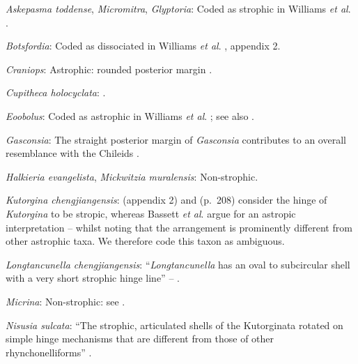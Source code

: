 \documentclass[openany]{book}
\begin{document}
\hypertarget{Askepasma_toddense-coding-71}{}
\emph{Askepasma toddense}, \emph{Micromitra}, \emph{Glyptoria}: Coded as
strophic in Williams \emph{et al}.
\citeyearpar{Williams1998Thediversity}.

\hypertarget{Botsfordia-coding-71}{}
\emph{Botsfordia}: Coded as dissociated in Williams \emph{et al}.
\citeyearpar{Williams1998Thediversity}, appendix 2.

\hypertarget{Craniops-coding-71}{}
\emph{Craniops}: Astrophic: rounded posterior margin \citep[see fig. 91
in][]{Williams2000LinguliformeaCraniiformea}.

\hypertarget{Cupitheca_holocyclata-coding-71}{}
\emph{Cupitheca holocyclata}: \citep{Skovsted2016}.

\hypertarget{Eoobolus-coding-71}{}
\emph{Eoobolus}: Coded as astrophic in Williams \emph{et al}.
\citeyearpar{Williams1998Thediversity}; see also
\citet{Balthasar2009Thebrachiopod}.

\hypertarget{Gasconsia-coding-71}{}
\emph{Gasconsia}: The straight posterior margin of \emph{Gasconsia}
contributes to an overall resemblance with the Chileids
\citep{Holmer2014OrdovicianSilurian}.

\hypertarget{Halkieria_evangelista-coding-71}{}
\emph{Halkieria evangelista}, \emph{Mickwitzia muralensis}:
Non-strophic.

\hypertarget{Kutorgina_chengjiangensis-coding-71}{}
\emph{Kutorgina chengjiangensis}: \citet{Williams1998Thediversity}
(appendix 2) and \citet{Williams2000LinguliformeaCraniiformea} (p.~208)
consider the hinge of \emph{Kutorgina} to be stropic, whereas Bassett
\emph{et al}. \citeyearpar{Bassett2001Functionalmorphology} argue for an
astropic interpretation -- whilst noting that the arrangement is
prominently different from other astrophic taxa. We therefore code this
taxon as ambiguous.

\hypertarget{Longtancunella_chengjiangensis-coding-71}{}
\emph{Longtancunella chengjiangensis}: ``\emph{Longtancunella} has an
oval to subcircular shell with a very short strophic hinge line'' --
\citet{Zhang2011Theexceptionally}.

\hypertarget{Micrina-coding-71}{}
\emph{Micrina}: Non-strophic: see \citet{Holmer2008TheEarly}.

\hypertarget{Nisusia_sulcata-coding-71}{}
\emph{Nisusia sulcata}: ``The strophic, articulated shells of the
Kutorginata rotated on simple hinge mechanisms that are different from
those of other rhynchonelliforms''
\citep[p.~208]{Williams2000LinguliformeaCraniiformea}.
\end{document}
